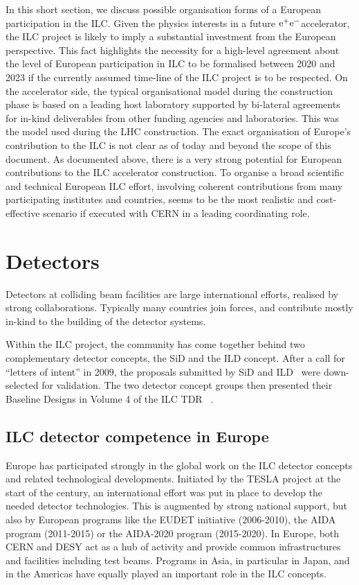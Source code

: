 \documentclass[%
 reprint,
 floatfix,
 amsmath,amssymb,
 aps,
]{revtex4-1}
\newcommand{\epem}{\mbox{${\rm e}^+{\rm e}^-$}}
\begin{document}
In this short section, we discuss possible organisation forms of a European
participation in the ILC. 
Given the physics interests in a future \epem accelerator, the ILC project is likely to imply a substantial investment from
the European perspective. This fact highlights the necessity for a high-level
agreement about the level of European participation in ILC to be formalised between 2020
and 2023 if the currently assumed time-line of the ILC project is to be respected.
On the accelerator side, the typical organisational model during the construction phase is based on a leading host laboratory supported by 
bi-lateral agreements for in-kind deliverables from other funding agencies and laboratories. This was the model used during the LHC construction. 
The exact organisation of Europe's contribution to the ILC is not clear as of today and beyond the scope of this document. 
As documented above, there is a very strong potential for European contributions to the ILC accelerator construction.
To organise a broad scientific and technical European ILC effort, involving coherent contributions from many participating institutes and countries, 
seems to be the most realistic and cost-effective scenario if executed with CERN in a leading coordinating role.

\section{\label{sec:det}Detectors}

Detectors at colliding beam facilities are large international efforts, realised by strong collaborations. 
Typically many countries join forces, and contribute mostly in-kind to the building of the detector systems. 

Within the ILC project, the community has come together behind two complementary detector concepts, the SiD and the ILD concept. 
After a call for ``letters of intent'' in 2009, the proposals submitted by SiD and ILD~\cite{Aihara:2009ad,Abe:2010aa} were down-selected for validation. The two detector concept 
groups then presented their Baseline Designs in Volume 4 of the ILC TDR ~\cite{Behnke:2013lya}.

\subsection{ILC detector competence in Europe~\label{sec:det:competence}}
Europe has participated strongly in the global work on the ILC detector concepts and 
related technological developments. Initiated by the TESLA project at the start 
of the century, an international effort was put in place to develop the needed 
detector technologies. This is augmented by strong national support, but also by 
European programs like the EUDET initiative (2006-2010), the AIDA program 
(2011-2015) or the AIDA-2020 program (2015-2020). In Europe, both CERN and DESY 
act as a hub of activity and provide common infrastructures and facilities 
including test beams. Programs in Asia, in particular in Japan, and in the 
Americas have equally played an important role in the ILC concepts. 
\end{document}
